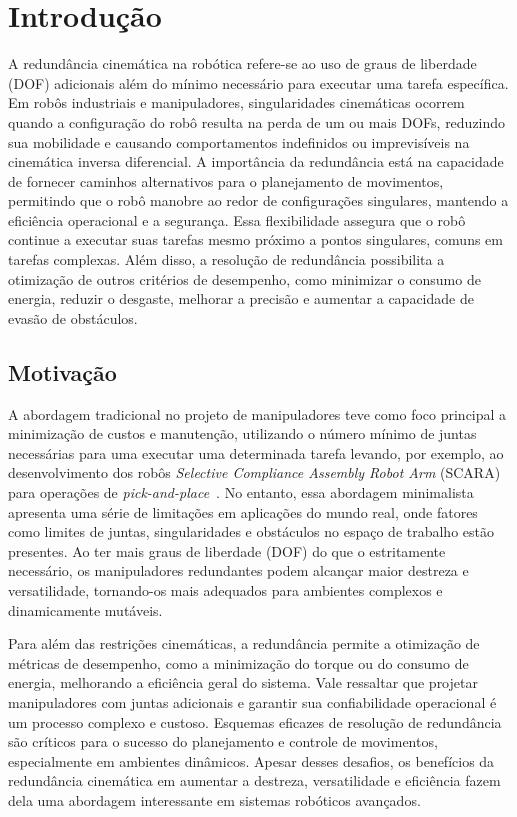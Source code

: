 \chapter{Introdução}\label{cap:introduction}

A redundância cinemática na robótica refere-se ao uso de graus de liberdade (DOF) adicionais além do mínimo necessário para executar uma
tarefa específica. Em robôs industriais e manipuladores, singularidades cinemáticas ocorrem quando a configuração do robô resulta na perda de um ou mais DOFs, 
reduzindo sua mobilidade e causando comportamentos indefinidos ou imprevisíveis na cinemática inversa diferencial. A importância da redundância está na capacidade de 
fornecer caminhos alternativos para o planejamento de movimentos, permitindo que o robô manobre ao redor de configurações singulares, mantendo a eficiência operacional e a segurança. Essa
flexibilidade assegura que o robô continue a executar suas tarefas mesmo próximo a pontos singulares, comuns em tarefas complexas. Além disso, a resolução
de redundância possibilita a otimização de outros critérios de desempenho, como minimizar o consumo de energia, reduzir o desgaste, melhorar a precisão e
aumentar a capacidade de evasão de obstáculos.

\section{Motivação}\label{sec:motivation}

A abordagem tradicional no projeto de manipuladores teve como foco principal a minimização de custos e manutenção,
utilizando o número mínimo de juntas necessárias para uma executar uma determinada tarefa levando, por exemplo, ao
desenvolvimento dos robôs \emph{Selective Compliance Assembly Robot Arm} (SCARA) para operações de \emph{pick-and-place}~\cite[p. 246]{siciliano_springer_2008}.
No entanto, essa abordagem  minimalista apresenta uma série de limitações em aplicações do mundo real, onde fatores como
limites de juntas, singularidades e obstáculos no espaço de trabalho estão presentes. Ao ter mais graus de liberdade (DOF)
do que o estritamente necessário, os manipuladores redundantes podem alcançar maior destreza e versatilidade, tornando-os
mais adequados para ambientes complexos e dinamicamente mutáveis.

Para além das restrições cinemáticas, a redundância permite a otimização de métricas de desempenho, como a minimização do torque ou do consumo de energia, melhorando a
eficiência geral do sistema. Vale ressaltar que projetar manipuladores com juntas adicionais e garantir sua confiabilidade operacional é um
processo complexo e custoso. Esquemas eficazes de resolução de redundância são críticos para o sucesso do planejamento e controle de movimentos,
especialmente em ambientes dinâmicos. Apesar desses desafios, os benefícios da redundância cinemática em aumentar a destreza, versatilidade e eficiência
fazem dela uma abordagem interessante em sistemas robóticos avançados.

